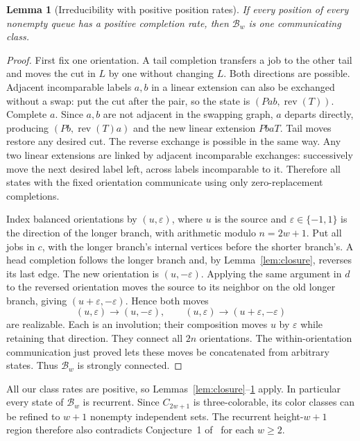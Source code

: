 \documentclass[11pt]{article}
\newtheorem{lemma}{Lemma}
\newcommand{\rev}{\operatorname{rev}}
\newcommand{\B}{\mathcal B_w}
\begin{document}
\begin{lemma}[Irreducibility with positive position rates]\label{lem:irreducible}
If every position of every nonempty queue has a positive completion rate, then $\B$ is one communicating class.
\end{lemma}
\begin{proof}
First fix one orientation. A tail completion transfers a job to the other tail and moves the cut in $L$ by one without changing $L$. Both directions are possible. Adjacent incomparable labels $a,b$ in a linear extension can also be exchanged without a swap: put the cut after the pair, so the state is $(Pab,\rev(T))$. Complete $a$. Since $a,b$ are not adjacent in the swapping graph, $a$ departs directly, producing $(Pb,\rev(T)a)$ and the new linear extension $PbaT$. Tail moves restore any desired cut. The reverse exchange is possible in the same way. Any two linear extensions are linked by adjacent incomparable exchanges: successively move the next desired label left, across labels incomparable to it. Therefore all states with the fixed orientation communicate using only zero-replacement completions.

Index balanced orientations by $(u,\varepsilon)$, where $u$ is the source and $\varepsilon\in\{-1,1\}$ is the direction of the longer branch, with arithmetic modulo $n=2w+1$. Put all jobs in $c$, with the longer branch's internal vertices before the shorter branch's. A head completion follows the longer branch and, by Lemma~\ref{lem:closure}, reverses its last edge. The new orientation is $(u,-\varepsilon)$. Applying the same argument in $d$ to the reversed orientation moves the source to its neighbor on the old longer branch, giving $(u+\varepsilon,-\varepsilon)$. Hence both moves
\[
 (u,\varepsilon)\longrightarrow(u,-\varepsilon),\qquad
 (u,\varepsilon)\longrightarrow(u+\varepsilon,-\varepsilon)
\]
are realizable. Each is an involution; their composition moves $u$ by $\varepsilon$ while retaining that direction. They connect all $2n$ orientations. The within-orientation communication just proved lets these moves be concatenated from arbitrary states. Thus $\B$ is strongly connected.
\end{proof}

All our class rates are positive, so Lemmas~\ref{lem:closure}--\ref{lem:irreducible} apply. In particular every state of $\B$ is recurrent. Since $C_{2w+1}$ is three-colorable, its color classes can be refined to $w+1$ nonempty independent sets. The recurrent height-$w+1$ region therefore also contradicts Conjecture~1 of~\cite{DG} for each $w\ge2$.
\end{document}
